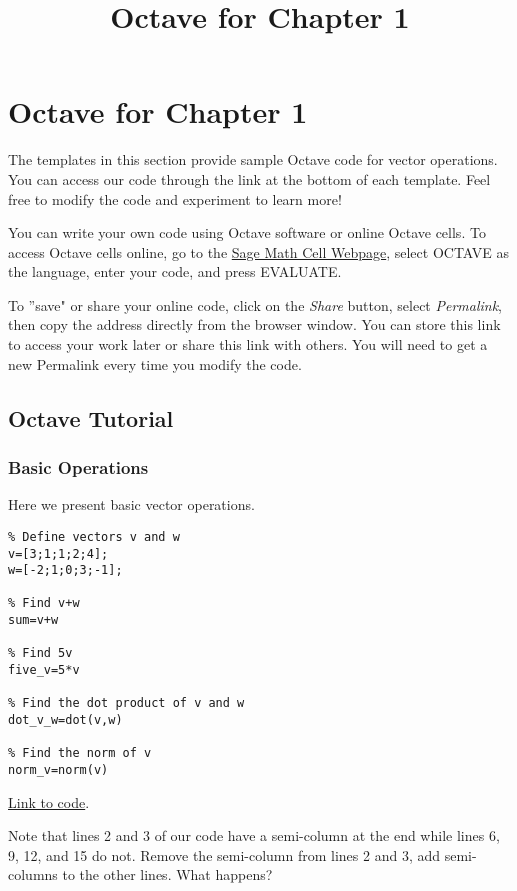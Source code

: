 \documentclass{ximera}
\title{Octave for Chapter 1} \license{CC BY-NC-SA 4.0}
\begin{document}
\begin{abstract}
\end{abstract}
\maketitle
\section*{Octave for Chapter 1}

The templates in this section provide sample Octave code for vector operations. You can access our code through the link at the bottom of each template.  Feel free to modify the code and experiment to learn more!  

You can write your own code using Octave software or online Octave cells.  To access Octave cells online, go to the \href{https://sagecell.sagemath.org/}{Sage Math Cell Webpage}, select OCTAVE as the language, enter your code, and press EVALUATE.  

To ''save" or share your online code, click on the \emph{Share} button, select \emph{Permalink}, then copy the address directly from the browser window.  You can store this link to access your work later or share this link with others.  You will need to get a new Permalink every time you modify the code.

\subsection*{Octave Tutorial}
\subsubsection*{Basic Operations}

\begin{template}\label{temp:vectorOps}
Here we present basic vector operations.
\begin{verbatim}
% Define vectors v and w
v=[3;1;1;2;4];
w=[-2;1;0;3;-1]; 

% Find v+w  
sum=v+w

% Find 5v
five_v=5*v

% Find the dot product of v and w
dot_v_w=dot(v,w)

% Find the norm of v
norm_v=norm(v)
\end{verbatim}

\href{https://sagecell.sagemath.org/?z=eJxdTUsKwyAQ3QveYTaBpG2gSZqVuCu9RChSolIX0WDMeP2O3TSUWbw37zNTwd1Y5w2gmVOIGyC8vIbMGcppEB1NL25PwVmWU9vTehWDaLuicFbBw1EazxmAs21fJNGDMSJn1qFRKMcTHoz0NqBDgjUGvc8Jgv09Jl2hypKwxktu_mo-xOWb56xQOl2gxuYDFmw51w==&lang=octave&interacts=eJyLjgUAARUAuQ==}{Link to code}.

\begin{remark}
    Note that lines 2 and 3 of our code have a semi-column at the end while lines 6, 9, 12, and 15 do not.  Remove the semi-column from lines 2 and 3, add semi-columns to the other lines.  What happens?
\end{remark}
\end{template}
\end{document}
